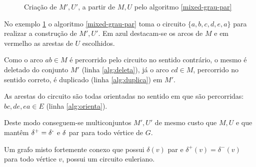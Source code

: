 \begin{figure}[H]
\begin{minipage}{.5\textwidth}
          \label{exmixed2}
        \end{minipage}%
        \caption{Criação de $M', U'$, a partir de $M, U$ pelo algoritmo \ref{mixed-grau-par}}
        \label{ex-grau-par}
    \end{figure}

    No exemplo \ref{ex-grau-par} o algoritmo \ref{mixed-grau-par} toma o circuito $\{a, b, c, d, e, a\}$ para realizar a construção de $M', U'$. 
    Em azul destacam-se os arcos de $M$ e em vermelho as arestas de $U$ escolhidos.

    Como o arco $ab \in M$ é percorrido pelo circuito no sentido contrário, o mesmo é deletado do conjunto $M'$ (linha \ref{alg:deleta}), já o arco $cd \in M$, percorrido no sentido correto, é duplicado (linha \ref{alg:duplica}) em $M'$.

    As arestas do circuito são todas orientadas no sentido em que são percorridas: $bc, de, ea \in E$ (linha \ref{alg:orienta}).

    Deste modo conseguem-se multiconjuntos $M', U'$ de mesmo custo que $M, U$ e que mantêm $\operatorname{\delta^+} = \operatorname{\delta^-}$ e $\operatorname{\delta}$ par para todo vértice de $G$.

    \begin{theorem} 
        Um grafo misto fortemente conexo que possui $\delta(v)$ par e $\delta^+(v) = \delta^-(v)$ para todo vértice $v$, possui um circuito euleriano.
        \label{mixed-eulerian}
    \end{theorem}

